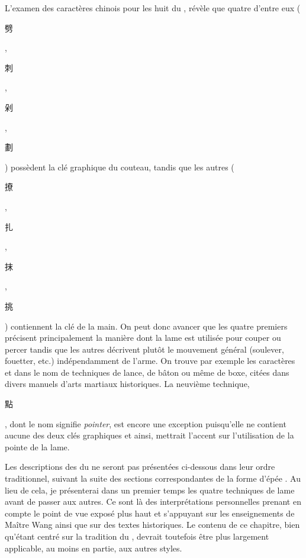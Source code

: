 L'examen des caractères chinois pour les huit \Jianfa{} du \Yangjia{} \Michuan{}, révèle que quatre d'entre eux (\Pi{} \begin{CJK*}{UTF8}{bsmi}劈\end{CJK*}, \Ci{} \begin{CJK*}{UTF8}{bsmi}刺\end{CJK*}, \Duo{} \begin{CJK*}{UTF8}{bsmi}剁\end{CJK*}, \Hua{} \begin{CJK*}{UTF8}{bsmi}劃\end{CJK*}) possèdent la clé graphique du couteau, tandis que les autres (\Liao{} \begin{CJK*}{UTF8}{bsmi}撩\end{CJK*}, \Zha{} \begin{CJK*}{UTF8}{bsmi}扎\end{CJK*}, \Mo{} \begin{CJK*}{UTF8}{bsmi}抹\end{CJK*}, \Tiao{} \begin{CJK*}{UTF8}{bsmi}挑\end{CJK*}) contiennent la clé de la main. On peut donc avancer que les quatre premiers précisent principalement la manière dont la lame est utilisée pour couper ou percer tandis que les autres décrivent plutôt le mouvement général (soulever, fouetter, etc.) indépendamment de l'arme. On trouve par exemple les caractères \Liao{} et \Zha{} dans le nom de techniques de lance, de bâton ou même de boxe, citées dans divers manuels d'arts martiaux historiques. La neuvième technique, \Dian{} \begin{CJK*}{UTF8}{bsmi}點\end{CJK*}, dont le nom signifie \textit{pointer}, est encore une exception puisqu'elle ne contient aucune des deux clés graphiques et ainsi, mettrait l'accent sur l'utilisation de la pointe de la lame.

Les descriptions des \Jiben{} \Jianfa{} du \Yangjia{} \Michuan{} \Taijijian{} ne seront pas présentées ci-dessous dans leur ordre traditionnel, suivant la suite des sections correspondantes de la forme d'épée \Kunlun{}. Au lieu de cela, je présenterai dans un premier temps les quatre techniques de lame avant de passer aux autres. Ce sont là des interprétations personnelles prenant en compte le point de vue exposé plus haut et s'appuyant sur les enseignements de Maître Wang ainsi que sur des textes historiques. Le contenu de ce chapitre, bien qu'étant centré sur la tradition du \Yangjia{} \Michuan{}, devrait toutefois être plus largement applicable, au moins en partie, aux autres styles.









